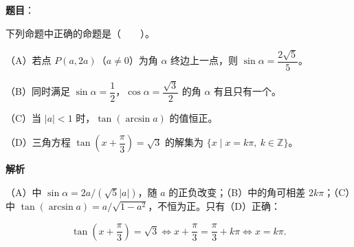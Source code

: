 \begin{answer}

\textbf{题目}：

下列命题中正确的命题是\mbox{（　　）}。

（A）若点 $P(a,2a)$（$a\ne0$）为角 $\alpha$ 终边上一点，则 $\sin\alpha=\dfrac{2\sqrt5}{5}$。

（B）同时满足 $\sin\alpha=\dfrac12$，$\cos\alpha=\dfrac{\sqrt3}{2}$ 的角 $\alpha$ 有且只有一个。

（C）当 $|a|<1$ 时，$\tan(\arcsin a)$ 的值恒正。

（D）三角方程 $\tan\left(x+\dfrac{\pi}{3}\right)=\sqrt3$ 的解集为 $\{x\mid x=k\pi,\ k\in\mathbb{Z}\}$。

\textbf{解析}

（A）中 $\sin\alpha=2a/(\sqrt5|a|)$，随 $a$ 的正负改变；（B）中的角可相差 $2k\pi$；（C）中 $\tan(\arcsin a)=a/\sqrt{1-a^2}$，不恒为正。只有（D）正确：

\nopagebreak[4]
\[
\tan\left(x+\frac\pi3\right)=\sqrt3
\Longleftrightarrow
x+\frac\pi3=\frac\pi3+k\pi
\Longleftrightarrow x=k\pi.
\]


\end{answer}

